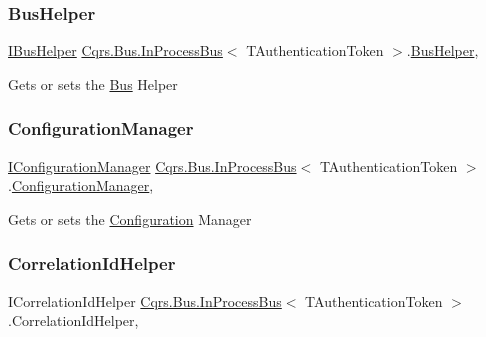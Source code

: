 \subsubsection{\texorpdfstring{Bus\+Helper}{BusHelper}}
{\footnotesize\ttfamily \hyperlink{interfaceCqrs_1_1Bus_1_1IBusHelper}{I\+Bus\+Helper} \hyperlink{classCqrs_1_1Bus_1_1InProcessBus}{Cqrs.\+Bus.\+In\+Process\+Bus}$<$ T\+Authentication\+Token $>$.\hyperlink{classCqrs_1_1Bus_1_1BusHelper}{Bus\+Helper}\hspace{0.3cm}{\ttfamily [get]}, {\ttfamily [protected]}}



Gets or sets the \hyperlink{namespaceCqrs_1_1Bus}{Bus} Helper 

\mbox{\label{classCqrs_1_1Bus_1_1InProcessBus_a403133ecfdbdfa85090366f1d5f95230}} 
\subsubsection{\texorpdfstring{Configuration\+Manager}{ConfigurationManager}}
{\footnotesize\ttfamily \hyperlink{interfaceCqrs_1_1Configuration_1_1IConfigurationManager}{I\+Configuration\+Manager} \hyperlink{classCqrs_1_1Bus_1_1InProcessBus}{Cqrs.\+Bus.\+In\+Process\+Bus}$<$ T\+Authentication\+Token $>$.\hyperlink{classCqrs_1_1Configuration_1_1ConfigurationManager}{Configuration\+Manager}\hspace{0.3cm}{\ttfamily [get]}, {\ttfamily [protected]}}



Gets or sets the \hyperlink{namespaceCqrs_1_1Configuration}{Configuration} Manager 

\mbox{\label{classCqrs_1_1Bus_1_1InProcessBus_a3ab05953af552331928ca0f1131c269d}} 
\subsubsection{\texorpdfstring{Correlation\+Id\+Helper}{CorrelationIdHelper}}
{\footnotesize\ttfamily I\+Correlation\+Id\+Helper \hyperlink{classCqrs_1_1Bus_1_1InProcessBus}{Cqrs.\+Bus.\+In\+Process\+Bus}$<$ T\+Authentication\+Token $>$.Correlation\+Id\+Helper\hspace{0.3cm}{\ttfamily [get]}, {\ttfamily [protected]}}



